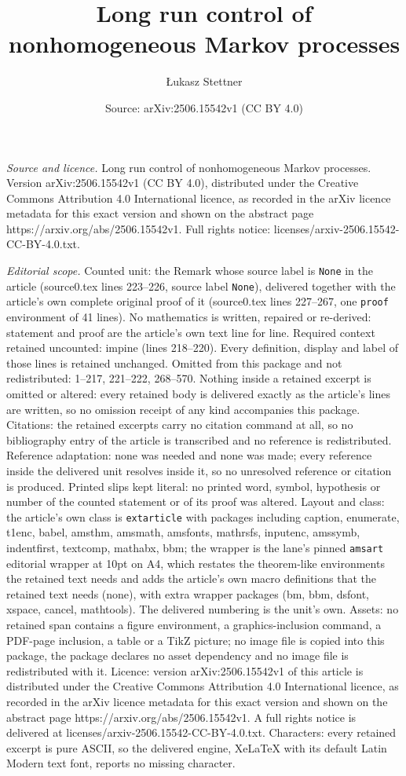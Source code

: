 \documentclass[10pt,a4paper]{amsart}
\title[Long run control of nonhomogeneous Markov processes]{Long run control of nonhomogeneous Markov processes}
\author{{\L}ukasz Stettner}
\date{Source: arXiv:2506.15542v1 (CC BY 4.0)}
\begin{document}
\maketitle

\noindent\emph{Source and licence.} Long run control of nonhomogeneous Markov processes. Version arXiv:2506.15542v1 (CC BY 4.0), distributed under the Creative Commons Attribution 4.0 International licence, as recorded in the arXiv licence metadata for this exact version and shown on the abstract page https://arxiv.org/abs/2506.15542v1. Full rights notice: licenses/arxiv-2506.15542-CC-BY-4.0.txt.\par\smallskip

\noindent\textit{Editorial scope.} Counted unit: the Remark whose source label is \texttt{None} in the article (source0.tex lines 223--226, source label \texttt{None}), delivered together with the article's own complete original proof of it (source0.tex lines 227--267, one \texttt{proof} environment of 41 lines). No mathematics is written, repaired or re-derived: statement and proof are the article's own text line for line. Required context retained uncounted: impine (lines 218--220). Every definition, display and label of those lines is retained unchanged. Omitted from this package and not redistributed: 1--217, 221--222, 268--570. Nothing inside a retained excerpt is omitted or altered: every retained body is delivered exactly as the article's lines are written, so no omission receipt of any kind accompanies this package. Citations: the retained excerpts carry no citation command at all, so no bibliography entry of the article is transcribed and no reference is redistributed. Reference adaptation: none was needed and none was made; every reference inside the delivered unit resolves inside it, so no unresolved reference or citation is produced. Printed slips kept literal: no printed word, symbol, hypothesis or number of the counted statement or of its proof was altered. Layout and class: the article's own class is \texttt{extarticle} with packages including caption, enumerate, t1enc, babel, amsthm, amsmath, amsfonts, mathrsfs, inputenc, amssymb, indentfirst, textcomp, mathabx, bbm; the wrapper is the lane's pinned \texttt{amsart} editorial wrapper at 10pt on A4, which restates the theorem-like environments the retained text needs and adds the article's own macro definitions that the retained text needs (none), with extra wrapper packages (bm, bbm, dsfont, xspace, cancel, mathtools). The delivered numbering is the unit's own. Assets: no retained span contains a figure environment, a graphics-inclusion command, a PDF-page inclusion, a table or a TikZ picture; no image file is copied into this package, the package declares no asset dependency and no image file is redistributed with it. Licence: version arXiv:2506.15542v1 of this article is distributed under the Creative Commons Attribution 4.0 International licence, as recorded in the arXiv licence metadata for this exact version and shown on the abstract page https://arxiv.org/abs/2506.15542v1. A full rights notice is delivered at licenses/arxiv-2506.15542-CC-BY-4.0.txt. Characters: every retained excerpt is pure ASCII, so the delivered engine, XeLaTeX with its default Latin Modern text font, reports no missing character.
\end{document}
